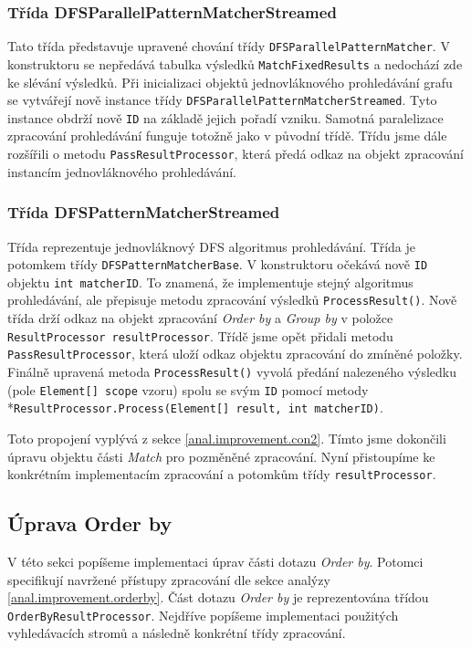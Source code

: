 \subsubsection{Třída DFSParallelPatternMatcherStreamed}

Tato třída představuje upravené chování třídy \texttt{DFSParallelPatternMatcher}.
V konstruktoru se nepředává tabulka výsledků  \texttt{MatchFixedResults} a nedochází zde ke slévání výsledků.
Při inicializaci objektů jednovláknového prohledávání grafu se vytvářejí nově instance třídy \texttt{DFSParallelPatternMatcherStreamed}. 
Tyto instance obdrží nově \texttt{ID} na základě jejich pořadí vzniku.
Samotná paralelizace zpracování prohledávání funguje totožně jako v původní třídě.
Třídu jsme dále rozšířili o metodu \texttt{PassResultProcessor}, která předá odkaz na objekt zpracování instancím jednovláknového prohledávání.

\subsubsection{Třída DFSPatternMatcherStreamed}

Třída reprezentuje jednovláknový DFS algoritmus prohledávání.
Třída je potomkem třídy \texttt{DFSPatternMatcherBase}.
V konstruktoru očekává nově \texttt{ID} objektu \texttt{int matcherID}.
To znamená, že implementuje stejný algoritmus prohledávání, ale přepisuje metodu zpracování výsledků \texttt{ProcessResult()}.
Nově třída drží odkaz na objekt zpracování \textit{Order by} a \textit{Group by} v položce \texttt{ResultProcessor resultProcessor}.
Třídě jsme opět přidali metodu \texttt{PassResultProcessor}, která uloží odkaz objektu zpracování do zmíněné položky.
Finálně upravená metoda \texttt{ProcessResult()} vyvolá předání nalezeného výsledku (pole \texttt{Element[] scope} vzoru) spolu se svým \texttt{ID} pomocí metody \\*\texttt{ResultProcessor.Process(Element[] result, int matcherID)}.

Toto propojení vyplývá z sekce \ref{anal.improvement.con2}.
Tímto jsme dokončili úpravu objektu části \textit{Match} pro pozměněné zpracování.
Nyní přistoupíme ke konkrétním implementacím zpracování a potomkům třídy \texttt{resultProcessor}.

\subsection{Úprava Order by}

V této sekci popíšeme implementaci úprav části dotazu \textit{Order by}.
Potomci specifikují navržené přístupy zpracování dle sekce analýzy \ref{anal.improvement.orderby}.
Část dotazu \textit{Order by} je reprezentována třídou \texttt{OrderByResultProcessor}.
Nejdříve popíšeme implementaci použitých vyhledávacích stromů a následně konkrétní třídy zpracování.

